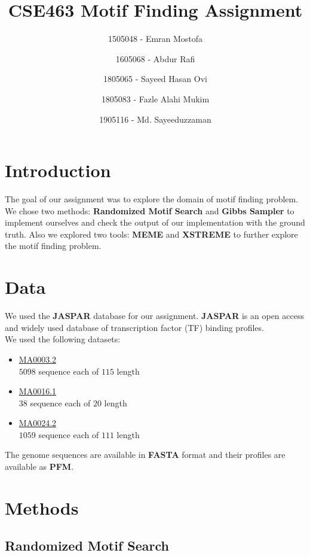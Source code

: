 \documentclass{article}
\title{CSE463 Motif Finding Assignment}
\author{1505048 - Emran Mostofa \and 1605068 - Abdur Rafi \and 1805065 - Sayeed Hasan Ovi \and 1805083 - Fazle Alahi Mukim \and 1905116 - Md. Sayeeduzzaman}
\begin{document}
\maketitle

\section*{Introduction}

The goal of our assignment was to explore the domain of motif finding problem. We chose two methods: \textbf{Randomized Motif Search} and \textbf{Gibbs Sampler} to implement ourselves and check the output of our implementation with the ground truth. Also we explored two tools: \textbf{MEME} and \textbf{XSTREME} to further explore the motif finding problem.

\section{Data}

We used the \textbf{JASPAR} database for our assignment. \textbf{JASPAR} is an open access and widely used database of transcription factor (TF) binding profiles. \\
We used the following datasets:
\begin{itemize}
    \item \href{https://jaspar.elixir.no/matrix/MA0003.2/}{MA0003.2}\\
    $5098$ sequence each of $115$ length
    \item \href{https://jaspar.elixir.no/matrix/MA0016.1/}{MA0016.1}\\
    $38$ sequence each of $20$ length
    \item \href{https://jaspar.elixir.no/matrix/MA0024.2/}{MA0024.2}\\
    $1059$ sequence each of $111$ length
\end{itemize}
The genome sequences are available in \textbf{FASTA} format and their profiles are available as \textbf{PFM}.

\section{Methods}

\subsection{Randomized Motif Search}
\end{document}
